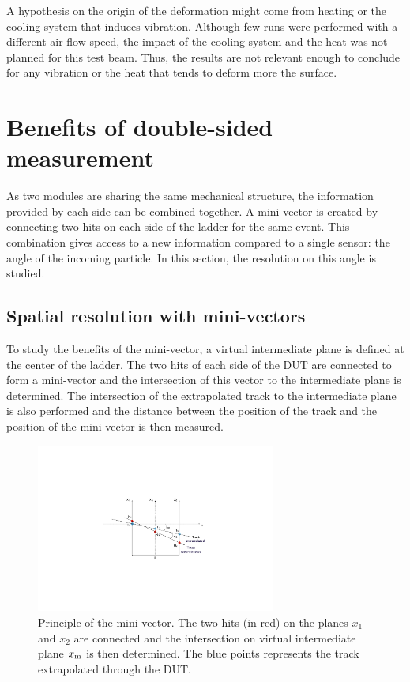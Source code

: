       A hypothesis on the origin of the deformation might come from heating or the cooling system that induces vibration.
      Although few runs were performed with a different air flow speed, the impact of the cooling system and the heat was not planned for this test beam.
      Thus, the results are not relevant enough to conclude for any vibration or the heat that tends to deform more the surface.
    
  \section{Benefits of double-sided measurement}
  
  As two modules are sharing the same mechanical structure, the information provided by each side can be combined together.
  A mini-vector is created by connecting two hits on each side of the ladder for the same event.
  This combination gives access to a new information compared to a single sensor: the angle of the incoming particle.
  In this section, the resolution on this angle is studied.

    \subsection{Spatial resolution with mini-vectors}

    To study the benefits of the mini-vector, a virtual intermediate plane is defined at the center of the ladder.
    The two hits of each side of the \gls{DUT} are connected to form a mini-vector and the intersection of this vector to the intermediate plane is determined.
    The intersection of the extrapolated track to the intermediate plane is also performed and the distance between the position of the track and the position of the mini-vector is then measured.

    \begin{figure}[!h]
      \centering
      \includegraphics[width=0.7\textwidth]{Pictures/deformation/mini_vectors.pdf}
      \caption{Principle of the mini-vector. The two hits (in red) on the planes $x_1$ and $x_2$ are connected and the intersection on virtual intermediate plane $x_{\rm{m}}$ is then determined. The blue points represents the track extrapolated through the DUT. }
      \label{fig:MV}
    \end{figure}

